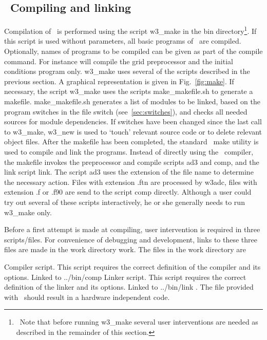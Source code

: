 \vssub
\subsection{~Compiling and linking} \label{sec:comp}
\vssub

Compilation of \ws\ is performed using the script {\file w3\_make} in the
{\dir bin} directory\footnote{~Note that before running {\file w3\_make}
several user interventions are needed as described in the remainder of this
section.}.  If this script is used without parameters, all basic programs of
\ws\ are compiled. Optionally, names of programs to be compiled can be given
as part of the compile command. For instance  will compile the grid preprocessor and the initial conditions
program only. {\file w3\_make} uses several of the scripts described in the
previous section. A graphical representation is given in
Fig.~\ref{fig:make}.  If necessary, the script {\file
w3\_make} uses the scripts {\file make\_makefile.sh} to generate a
makefile. {\file make\_makefile.sh} generates a list of modules to be linked,
based on the program switches in the file {\file switch}
(see~\para\ref{sec:switches}), and checks all needed sources for module
dependencies. If switches have been changed since the last call to {\file
w3\_make}, {\file w3\_new} is used to `touch' relevant source code or to
delete relevant object files. After the makefile has been completed, the
standard \unix\ make utility is used to compile and link the programs. Instead
of directly using the \fortran\ compiler, the makefile invokes the
preprocessor and compile scripts {\file ad3} and {\file comp}, and the link
script {\file link}. The script {\file ad3} uses the extension of the file
name to determine the necessary action. Files with extension {\file .ftn} are
processed by {\code w3adc}, files with extension {\file .f} or {\file .f90}
are send to the script {\code comp} directly.  Although a user could try out
several of these scripts interactively, he or she generally needs to run
{w3\_make} only.

\vspace{\baselineskip} \noindent 
Before a first attempt is made at compiling, user intervention is required in
three scripts/files. For convenience of debugging and development, links to
these three files are made in the work directory {\dir work}. The files in the
work directory are

\begin{flist}
  {Compiler script. This script requires the correct definition
             of the compiler and its options. Linked to {\file ../bin/comp}}
  {Linker script. This script requires the correct definition
             of the linker and its options. Linked to {\file ../bin/link}}
. The
             file provided with \ws\ should result in a hardware independent
             code.
\end{flist}

